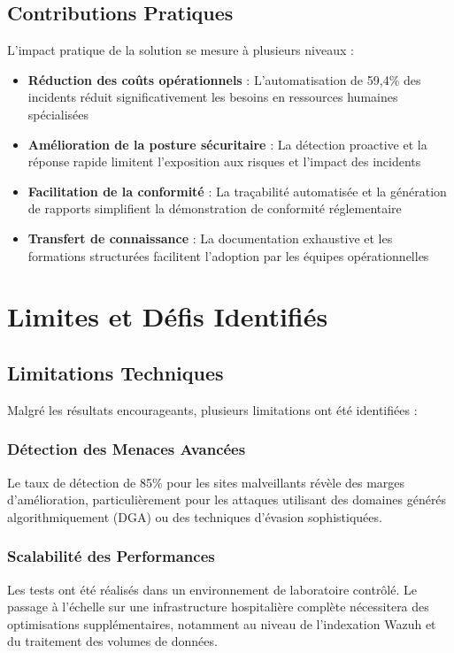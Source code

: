 \subsection{Contributions Pratiques}

L'impact pratique de la solution se mesure à plusieurs niveaux :

\begin{itemize}
  \item \textbf{Réduction des coûts opérationnels} : L'automatisation de 59,4\% des incidents réduit significativement les besoins en ressources humaines spécialisées
  \item \textbf{Amélioration de la posture sécuritaire} : La détection proactive et la réponse rapide limitent l'exposition aux risques et l'impact des incidents
  \item \textbf{Facilitation de la conformité} : La traçabilité automatisée et la génération de rapports simplifient la démonstration de conformité réglementaire
  \item \textbf{Transfert de connaissance} : La documentation exhaustive et les formations structurées facilitent l'adoption par les équipes opérationnelles
\end{itemize}

\section{Limites et Défis Identifiés}

\subsection{Limitations Techniques}

Malgré les résultats encourageants, plusieurs limitations ont été identifiées :

\subsubsection{Détection des Menaces Avancées}
Le taux de détection de 85\% pour les sites malveillants révèle des marges d'amélioration, particulièrement pour les attaques utilisant des domaines générés algorithmiquement (DGA) ou des techniques d'évasion sophistiquées.

\subsubsection{Scalabilité des Performances}
Les tests ont été réalisés dans un environnement de laboratoire contrôlé. Le passage à l'échelle sur une infrastructure hospitalière complète nécessitera des optimisations supplémentaires, notamment au niveau de l'indexation Wazuh et du traitement des volumes de données.

